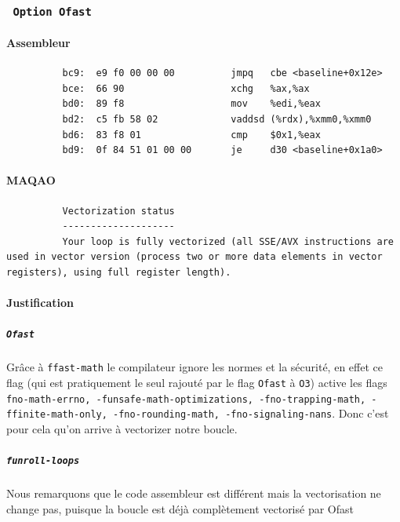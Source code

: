 \documentclass{report}
\begin{document}
      \subsubsection{ \texttt{ Option Ofast } }
      \paragraph{Assembleur}
        \begin{verbatim}
          bc9:	e9 f0 00 00 00       	jmpq   cbe <baseline+0x12e>
          bce:	66 90                	xchg   %ax,%ax
          bd0:	89 f8                	mov    %edi,%eax
          bd2:	c5 fb 58 02          	vaddsd (%rdx),%xmm0,%xmm0
          bd6:	83 f8 01             	cmp    $0x1,%eax
          bd9:	0f 84 51 01 00 00    	je     d30 <baseline+0x1a0>
        \end{verbatim}
      \paragraph{MAQAO}
        \begin{verbatim}
          Vectorization status
          --------------------
          Your loop is fully vectorized (all SSE/AVX instructions are used in vector version (process two or more data elements in vector registers), using full register length).
        \end{verbatim}
	      \paragraph{Justification}
        \subparagraph{\texttt{Ofast}}
	      Grâce à \texttt{ffast-math} le compilateur ignore les normes et la sécurité, en effet ce flag
        (qui est pratiquement le seul rajouté par le flag \texttt{Ofast} à \texttt{O3}) active les flags
        \texttt{ fno-math-errno, -funsafe-math-optimizations, -fno-trapping-math, -ffinite-math-only, -fno-rounding-math, -fno-signaling-nans}.
        Donc c'est pour cela qu'on arrive à vectorizer notre boucle.
        \subparagraph{\texttt{funroll-loops}}
        Nous remarquons que le code assembleur est différent mais la vectorisation ne change pas, puisque la boucle
        est déjà complètement vectorisé par Ofast
\end{document}
